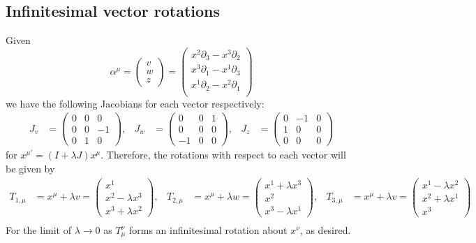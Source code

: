 \documentclass{article}
\begin{document}
 			\subsection{Infinitesimal vector rotations}
 			Given
 			$$
 			\alpha^\mu = 
 			\begin{pmatrix}
 				v\\
 				w\\
 				z
 			\end{pmatrix} =
 			\begin{pmatrix}
 				x^2 \partial_3   - x^3 \partial_2 \\
 				x^3 \partial_1  - x^1 \partial_3 \\
 				x^1 \partial_2  - x^2 \partial_1 \\
 			\end{pmatrix}
			$$
			we have the following Jacobians for each vector respectively: 
			\begin{align*}
				J_{v} &= 
					\begin{pmatrix}
						0		&		0		&		0		\\
						0		&	0		&	-1		\\
						0		&	1	&	0
					\end{pmatrix},
					 &
				J_{w}  &= 
					\begin{pmatrix}
						0	&		0		&	1		\\
						0		&		0		&	0			\\
						-1	&		0		&	0
					\end{pmatrix}, &
				J_z &= 
					\begin{pmatrix}
						0	&	-1		&		0		\\
						1		&	0		&	0		\\
						0		&	0		&	0
					\end{pmatrix}
			\end{align*}
			for $x^{\mu'} = (I + \lambda J)x^\mu$. Therefore, the rotations with respect to each vector will be given by
			\begin{align*}
				T_{1,\mu} &= x^\mu + \lambda v = \begin{pmatrix}
					x^1 \\
					x^2 - \lambda x^3 \\
					x^3 + \lambda x^2
				\end{pmatrix}, &
				T_{2,\mu} &= x^\mu + \lambda w = \begin{pmatrix}
					x^1 + \lambda x^3 \\
					x^2  \\
					x^3 - \lambda x^1
				\end{pmatrix}, &
				T_{3,\mu} &= x^\mu + \lambda v = \begin{pmatrix}
					x^1 - \lambda x^2\\
					x^2 + \lambda x^1 \\
					x^3
				\end{pmatrix} \\
			\end{align*}
 			For the limit of $\lambda \to 0$ as $T_\mu^\nu$ forms an infinitesimal rotation about $x^\nu$, as desired.
 			
\end{document}
